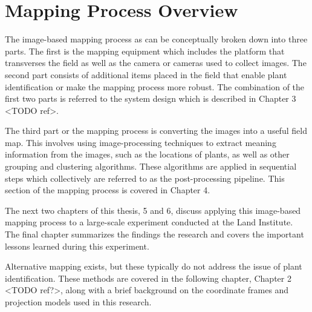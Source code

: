 \section{Mapping Process Overview} 

The image-based mapping process as can be conceptually broken down into three parts.  The first is the mapping equipment which includes the platform that transverses the field as well as the camera or cameras used to collect images.  The second part consists of additional items placed in the field that enable plant identification or make the mapping process more robust.  The combination of the first two parts is referred to the system design which is described in Chapter 3 <TODO ref>. 

The third part or the mapping process is converting the images into a useful field map.  This involves using image-processing techniques to extract meaning information from the images, such as the locations of plants, as well as other grouping and clustering algorithms.  These algorithms are applied in sequential steps which collectively are referred to as the post-processing pipeline.  This section of the mapping process is covered in Chapter 4. 

The next two chapters of this thesis, 5 and 6, discuss applying this image-based mapping process to a large-scale experiment conducted at the Land Institute.  The final chapter summarizes the findings the research and covers the important lessons learned during this experiment.

Alternative mapping exists, but these typically do not address the issue of plant identification.  These methods are covered in the following chapter, Chapter 2 <TODO ref?>, along with a brief background on the coordinate frames and projection models used in this research.